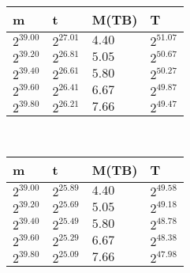  \ 
\begin{tabular}{llll}
m & t & M(TB) & T \\ \hline
$2^{39.00}$ & $2^{27.01}$ & $4.40$ & $2^{51.07}$ \\
$2^{39.20}$ & $2^{26.81}$ & $5.05$ & $2^{50.67}$ \\
$2^{39.40}$ & $2^{26.61}$ & $5.80$ & $2^{50.27}$ \\
$2^{39.60}$ & $2^{26.41}$ & $6.67$ & $2^{49.87}$ \\
$2^{39.80}$ & $2^{26.21}$ & $7.66$ & $2^{49.47}$ \\
\end{tabular}
 \ 
\begin{tabular}{llll}
m & t & M(TB) & T \\ \hline
$2^{39.00}$ & $2^{25.89}$ & $4.40$ & $2^{49.58}$ \\
$2^{39.20}$ & $2^{25.69}$ & $5.05$ & $2^{49.18}$ \\
$2^{39.40}$ & $2^{25.49}$ & $5.80$ & $2^{48.78}$ \\
$2^{39.60}$ & $2^{25.29}$ & $6.67$ & $2^{48.38}$ \\
$2^{39.80}$ & $2^{25.09}$ & $7.66$ & $2^{47.98}$ \\
\end{tabular}